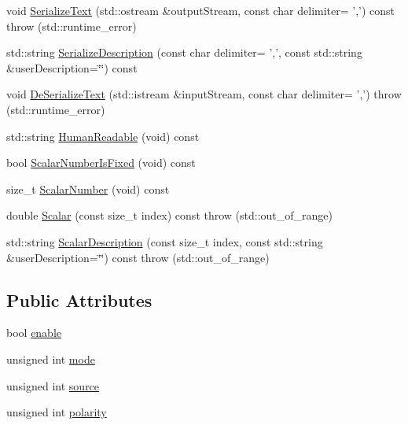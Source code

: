\begin{DoxyCompactItemize}
\item 
void \hyperlink{classsvl_filter_source_video_capture_types_1_1_external_trigger_a58aa61cfc67b315fc205fe27acef7097}{Serialize\-Text} (std\-::ostream \&output\-Stream, const char delimiter= ',') const   throw (std\-::runtime\-\_\-error)
\item 
std\-::string \hyperlink{classsvl_filter_source_video_capture_types_1_1_external_trigger_af975c7e888dbce4e9131c8f8a0dbc6cc}{Serialize\-Description} (const char delimiter= ',', const std\-::string \&user\-Description=\char`\"{}\char`\"{}) const 
\item 
void \hyperlink{classsvl_filter_source_video_capture_types_1_1_external_trigger_aa3c206903b648f6cdce2b15d12fe1730}{De\-Serialize\-Text} (std\-::istream \&input\-Stream, const char delimiter= ',')  throw (std\-::runtime\-\_\-error)
\item 
std\-::string \hyperlink{classsvl_filter_source_video_capture_types_1_1_external_trigger_a96c0d41a941808985245b026da33e50d}{Human\-Readable} (void) const 
\item 
bool \hyperlink{classsvl_filter_source_video_capture_types_1_1_external_trigger_a70aec90cd4e5e774c0772eb0e81934d9}{Scalar\-Number\-Is\-Fixed} (void) const 
\item 
size\-\_\-t \hyperlink{classsvl_filter_source_video_capture_types_1_1_external_trigger_a0745b7e8d52502de9e372b435bd3ac86}{Scalar\-Number} (void) const 
\item 
double \hyperlink{classsvl_filter_source_video_capture_types_1_1_external_trigger_abd8fd72625d87f3e9db9459ebd54dba0}{Scalar} (const size\-\_\-t index) const   throw (std\-::out\-\_\-of\-\_\-range)
\item 
std\-::string \hyperlink{classsvl_filter_source_video_capture_types_1_1_external_trigger_ae0ef010d742bc6d55e9661d7fad0217d}{Scalar\-Description} (const size\-\_\-t index, const std\-::string \&user\-Description=\char`\"{}\char`\"{}) const   throw (std\-::out\-\_\-of\-\_\-range)
\end{DoxyCompactItemize}
\subsection*{Public Attributes}
\begin{DoxyCompactItemize}
\item 
bool \hyperlink{classsvl_filter_source_video_capture_types_1_1_external_trigger_a79a0e5652f004b6b16f759d680bc9e55}{enable}
\item 
unsigned int \hyperlink{classsvl_filter_source_video_capture_types_1_1_external_trigger_ad847cfd7b8858f3e55c4933e0e794eab}{mode}
\item 
unsigned int \hyperlink{classsvl_filter_source_video_capture_types_1_1_external_trigger_a90c5c2fc64176eb2220cdd9890795301}{source}
\item 
unsigned int \hyperlink{classsvl_filter_source_video_capture_types_1_1_external_trigger_a133a895468d169b381e343f3954e81fb}{polarity}
\end{DoxyCompactItemize}


